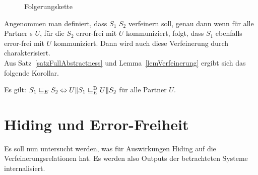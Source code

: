 \begin{figure}[h!tbp]
  \begin{center}
    \caption{Folgerungskette}
\label{Folgerungskette}
  \end{center}
\end{figure}

Angenommen man definiert, dass $S_1$ $S_2$ verfeinern
soll, genau dann wenn für alle Partner \EIO{}s $U$, für die $S_2$ error-frei
mit $U$ kommuniziert, folgt, dass $S_1$ ebenfalls error-frei mit $U$
kommuniziert. Dann wird auch diese Verfeinerung durch \ERel{}
charakterisiert.\\
Aus Satz~\ref{satzFullAbstractness} und Lemma~\ref{lemVerfeinerung} ergibt sich
das folgende Korollar.

\begin{kor}
  Es gilt: $S_1\sqsubseteq _E S_2 \Leftrightarrow U\|S_1\sqsubseteq _E^\mathrm{B} U\|S_2$ für alle Partner
  $U$.
\end{kor}

\section{Hiding und Error-Freiheit}

Es soll nun untersucht werden, was für Auswirkungen Hiding auf die
Verfeinerungsrelationen hat. Es werden also Outputs der betrachteten Systeme internalisiert.

